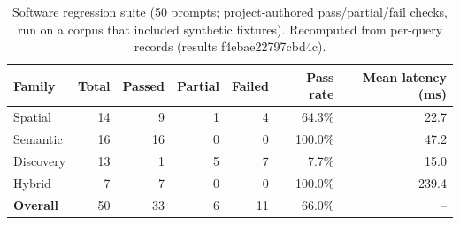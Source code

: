 \begin{table}[htbp]\centering\small
\caption{Software regression suite (50 prompts; project-authored pass/partial/fail checks, run on a corpus that included synthetic fixtures). Recomputed from per-query records (results f4ebae22797cbd4c).}\label{tab:benchmark}
\begin{tabular}{lrrrrrr}
\toprule
Family & Total & Passed & Partial & Failed & Pass rate & Mean latency (ms) \\
\midrule
Spatial & 14 & 9 & 1 & 4 & 64.3\% & 22.7 \\
Semantic & 16 & 16 & 0 & 0 & 100.0\% & 47.2 \\
Discovery & 13 & 1 & 5 & 7 & 7.7\% & 15.0 \\
Hybrid & 7 & 7 & 0 & 0 & 100.0\% & 239.4 \\
\textbf{Overall} & 50 & 33 & 6 & 11 & 66.0\% & -- \\
\bottomrule
\end{tabular}
\end{table}
